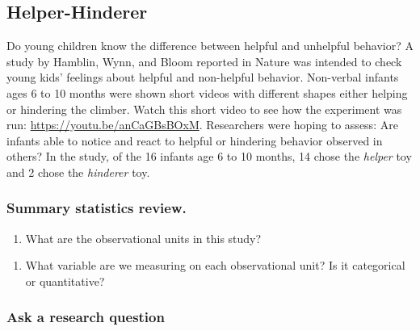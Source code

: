 \documentclass[
]{report}
\providecommand{\tightlist}{%
  \setlength{\itemsep}{0pt}\setlength{\parskip}{0pt}}
\begin{document}
\hypertarget{helper-hinderer}{%
\subsection{Helper-Hinderer}\label{helper-hinderer}}

Do young children know the difference between helpful and unhelpful behavior? A study by Hamblin, Wynn, and Bloom reported in Nature was intended to check young kids' feelings about helpful and non-helpful behavior. Non-verbal infants ages 6 to 10 months were shown short videos with different shapes either helping or hindering the climber. Watch this short video to see how the experiment was run: \url{https://youtu.be/anCaGBsBOxM}. Researchers were hoping to assess: Are infants able to notice and react to helpful or hindering behavior observed in others? In the study, of the 16 infants age 6 to 10 months, 14 chose the \emph{helper} toy and 2 chose the \emph{hinderer} toy.

\hypertarget{summary-statistics-review.}{%
\subsubsection*{Summary statistics review.}\label{summary-statistics-review.}}

\begin{enumerate}
\def\labelenumi{\arabic{enumi}.}
\tightlist
\item
  What are the observational units in this study?
\end{enumerate}

\vspace{0.5in}

\begin{enumerate}
\def\labelenumi{\arabic{enumi}.}
\setcounter{enumi}{1}
\tightlist
\item
  What variable are we measuring on each observational unit? Is it categorical or quantitative?
\end{enumerate}

\vspace{0.5in}

\hypertarget{ask-a-research-question}{%
\subsubsection*{Ask a research question}\label{ask-a-research-question}}
\end{document}

